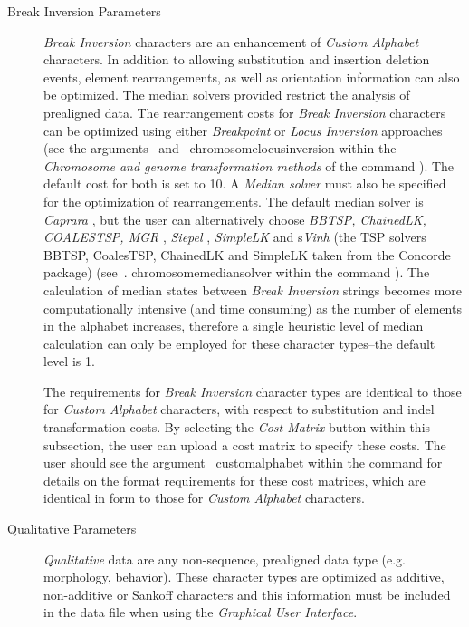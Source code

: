 \begin{description}
\item [Break Inversion Parameters] \emph{Break Inversion} characters are an enhancement of 				
\emph{Custom Alphabet} characters. In addition to allowing substitution and insertion deletion events, 
element rearrangements, as well as orientation information can also be optimized.
The median solvers provided restrict the analysis of prealigned data. 
The rearrangement costs for \emph{Break Inversion} characters can be optimized using 
either \emph{Breakpoint} or \emph{Locus Inversion} approaches (see the 
arguments~ and~
{chromosomelocusinversion} within the \emph{Chromosome and genome transformation methods} 
of the command ). The default cost for both is set to 10. A \emph{Median solver} 
must also be specified for the optimization of rearrangements. The default median solver is \emph{Caprara}
\cite{Caprara2001}, but the user can alternatively choose \emph{BBTSP, ChainedLK, COALESTSP, MGR} 
\cite{bourqueandpevzner2002}, \emph{Siepel} \cite{siepelmoret2001}, \emph{SimpleLK} and 
s\emph{Vinh} (the TSP solvers BBTSP, CoalesTSP, 
ChainedLK and SimpleLK taken from the Concorde package) (see~.
{chromosomemediansolver}  within the command ).  
The calculation of median states between \emph {Break Inversion} strings becomes more 
computationally intensive (and time consuming) as the number of elements in the alphabet 
increases, therefore a single heuristic level of median calculation can only be employed 
for these character types--the default level is 1.

\indent The requirements for \emph{Break Inversion} character types are identical to those for 
\emph{Custom Alphabet} characters, with respect to substitution and indel transformation costs. 
By selecting the  \emph{Cost Matrix} button within this subsection, the user can upload a 
cost matrix to specify these costs. The user should see the argument~
{customalphabet} within the command  for details on the format requirements 
for these cost matrices, which are identical in form to those for \emph{Custom Alphabet} characters.

\item [Qualitative Parameters] \emph{Qualitative} data are any non-sequence, prealigned 
data type (e.g. morphology, behavior). These character types are optimized as additive, 
non-additive or Sankoff characters and this information must be included in the data file when 
using the \emph{Graphical User Interface}.

\end{description}

